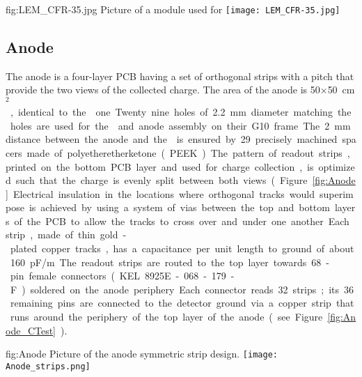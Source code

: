 \begin{dunefigure}
{fig:LEM_CFR-35.jpg}
{Picture of a  module used for  }
\texttt{[image: LEM\_CFR-35.jpg]}
\end{dunefigure}

\subsection{Anode}
\label{sec:fddp-crp-anode}
 
The anode is a four-layer PCB having a set of orthogonal strips with a \dpstrippitch pitch that provide the two views of the collected charge. The area of the anode is  \num{50}$\times$\SI{50}{cm$^2$}, identical to the  one. Twenty nine holes of \SI{2.2}{mm} diameter matching the  holes are used for the  and anode assembly on their G10 frame. The \SI{2}{mm} distance between the anode and the  is ensured by \num{29} precisely machined spacers made of polyetheretherketone (PEEK). 

The pattern of readout strips, printed on the bottom PCB layer and used for charge collection, is optimized such that the charge is evenly split between both views (Figure~\ref{fig:Anode}. Electrical insulation in the locations where orthogonal tracks would superimpose is achieved by 
using a system of vias between the top and bottom layers of the PCB to allow the tracks to cross over and under one another. 
Each strip, made of thin gold-plated copper tracks, has a capacitance per unit length to ground of about 
\SI{160}{pF/m}. The readout strips are routed to the top layer towards \num{68}-pin female connectors (KEL 8925E-068-179-F) soldered on the anode periphery. Each connector reads \num{32} strips; its \num{36} remaining pins are connected to the detector ground via a copper strip that runs around the periphery of the top layer of the anode (see Figure \ref{fig:Anode_CTest}). 

\begin{dunefigure}
{fig:Anode}
{Picture of the anode symmetric \twod strip design.}
  \texttt{[image: Anode\_strips.png]}
\end{dunefigure}


